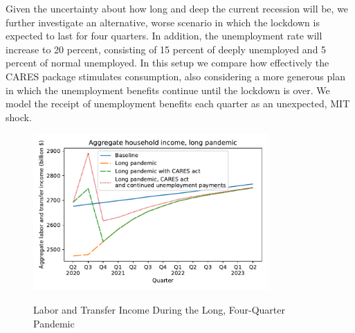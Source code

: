 Given the uncertainty about how long and deep the current recession will be, we further investigate an alternative, worse scenario in which the lockdown is expected to last for four quarters.  
In addition, the unemployment rate will increase to 20 percent, consisting of 15 percent of deeply unemployed and 5 percent of normal unemployed.  
In this setup we compare how effectively the CARES package stimulates consumption, also considering a more generous plan in which the unemployment benefits continue until the lockdown is over.
We model the receipt of unemployment benefits each quarter as an unexpected, MIT shock.

\begin{figure}
	\centering
	\caption{Labor and Transfer Income During the Long, Four-Quarter Pandemic}
	\label{inc_response_pandemic}
	{ \includegraphics[width=0.8\textwidth]{./Figures/AggLT_long_pandemic}}
\end{figure}

